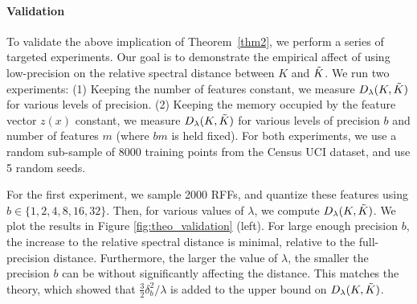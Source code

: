 



\paragraph{Validation} To validate the above implication of Theorem~\ref{thm2}, we perform a series of targeted experiments. Our goal is to demonstrate the empirical affect of using low-precision on the relative spectral distance between $K$ and $\tilde{K}$. We run two experiments: (1) Keeping the number of features constant, we measure $D_{\lambda}(K,\tilde{K})$ for various levels of precision. (2) Keeping the memory occupied by the feature vector $z(x)$ constant, we measure $D_{\lambda}(K,\tilde{K})$ for various levels of precision $b$ and number of features $m$ (where $bm$ is held fixed). For both experiments, we use a random sub-sample of $8000$ training points from the Census UCI dataset, and use 5 random seeds.

For the first experiment, we sample 2000 RFFs, and quantize these features using $b \in \{1,2,4,8,16,32\}$.  Then, for various values of $\lambda$, we compute $D_{\lambda}(K,\tilde{K})$.  We plot the results in Figure \ref{fig:theo_validation} (left). For large enough precision $b$, the increase to the relative spectral distance is minimal, relative to the full-precision distance. Furthermore, the larger the value of $\lambda$, the smaller the precision $b$ can be without significantly affecting the distance. This matches the theory, which showed that $\frac{3}{2}\delta_b^2/\lambda$ is added to the upper bound on $D_{\lambda}(K,\tilde{K})$.

